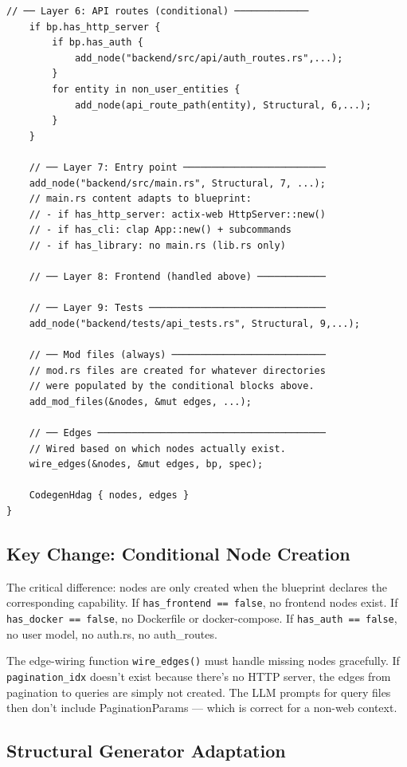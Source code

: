 \documentclass[11pt,a4paper]{article}
\begin{document}
\begin{lstlisting}[style=rust]
    // ── Layer 6: API routes (conditional) ─────────────
    if bp.has_http_server {
        if bp.has_auth {
            add_node("backend/src/api/auth_routes.rs",...);
        }
        for entity in non_user_entities {
            add_node(api_route_path(entity), Structural, 6,...);
        }
    }
    
    // ── Layer 7: Entry point ─────────────────────────
    add_node("backend/src/main.rs", Structural, 7, ...);
    // main.rs content adapts to blueprint:
    // - if has_http_server: actix-web HttpServer::new()
    // - if has_cli: clap App::new() + subcommands
    // - if has_library: no main.rs (lib.rs only)
    
    // ── Layer 8: Frontend (handled above) ────────────
    
    // ── Layer 9: Tests ───────────────────────────────
    add_node("backend/tests/api_tests.rs", Structural, 9,...);
    
    // ── Mod files (always) ───────────────────────────
    // mod.rs files are created for whatever directories
    // were populated by the conditional blocks above.
    add_mod_files(&nodes, &mut edges, ...);
    
    // ── Edges ────────────────────────────────────────
    // Wired based on which nodes actually exist.
    wire_edges(&nodes, &mut edges, bp, spec);
    
    CodegenHdag { nodes, edges }
}
\end{lstlisting}

\subsection{Key Change: Conditional Node Creation}

The critical difference: nodes are only created when the blueprint
declares the corresponding capability. If \texttt{has\_frontend == false},
no frontend nodes exist. If \texttt{has\_docker == false}, no Dockerfile
or docker-compose. If \texttt{has\_auth == false}, no user model, no 
auth.rs, no auth\_routes.

The edge-wiring function \texttt{wire\_edges()} must handle missing 
nodes gracefully. If \texttt{pagination\_idx} doesn't exist because 
there's no HTTP server, the edges from pagination to queries are simply 
not created. The LLM prompts for query files then don't include 
PaginationParams --- which is correct for a non-web context.

\subsection{Structural Generator Adaptation}
\end{document}

